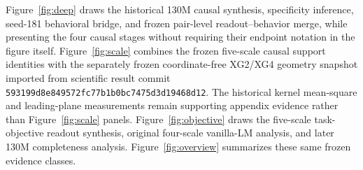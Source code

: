 Figure~\ref{fig:deep} draws the historical 130M causal synthesis,
specificity inference, seed-181 behavioral bridge, and frozen pair-level
readout--behavior merge, while presenting the four causal stages without
requiring their endpoint notation in the figure itself.
Figure~\ref{fig:scale} combines the frozen five-scale causal support
identities with the separately frozen coordinate-free XG2/XG4 geometry
snapshot imported from scientific result commit
\texttt{593199d8e849572fc77b1b0bc7475d3d19468d12}.
The historical kernel mean-square and leading-plane measurements remain
supporting appendix evidence rather than Figure~\ref{fig:scale} panels.
Figure~\ref{fig:objective} draws the five-scale task-objective readout
synthesis, original four-scale vanilla-LM analysis, and later 130M
completeness analysis. Figure~\ref{fig:overview} summarizes these same
frozen evidence classes.
